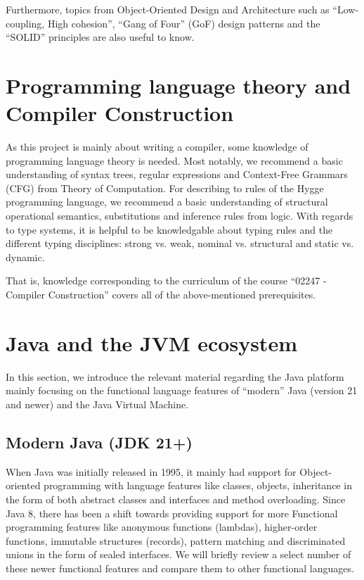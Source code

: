 Furthermore, topics from Object-Oriented Design and Architecture such as ``Low-coupling, High cohesion''\cite{clean_architecture}, ``Gang of Four'' (GoF)\cite{gof} design patterns
and the ``SOLID'' principles\cite{clean_architecture} are also useful to know.

\section{Programming language theory and Compiler Construction}

As this project is mainly about writing a compiler, some knowledge of programming language theory is needed.
Most notably, we recommend a basic understanding of syntax trees, regular expressions and Context-Free Grammars (CFG) from Theory of Computation\cite{sipser}.
For describing to rules of the Hygge programming language, we recommend a basic understanding of structural operational semantics, substitutions
and inference rules from logic. With regards to type systems, it is helpful to be knowledgable about typing rules and the different
typing disciplines: strong vs. weak, nominal vs. structural and static vs. dynamic.

That is, knowledge corresponding to the curriculum of the course ``02247 - Compiler Construction''\cite{curriculum_02247} covers all of the above-mentioned prerequisites.

\section{Java and the JVM ecosystem}

In this section, we introduce the relevant material regarding the Java platform mainly focusing
on the functional language features of ``modern'' Java (version 21 and newer) and the Java Virtual
Machine.

\subsection{Modern Java (JDK 21+)}

When Java was initially released in 1995, it mainly had support for Object-oriented 
programming with language features like classes, objects, 
inheritance in the form of both abstract classes and interfaces and method overloading.
Since Java 8, there has been a shift towards providing support for more Functional 
programming features like anonymous functions (lambdas), higher-order functions, immutable
structures (records), pattern matching and discriminated unions in the form of sealed 
interfaces. We will briefly review a select number of these newer functional features
and compare them to other functional languages.

